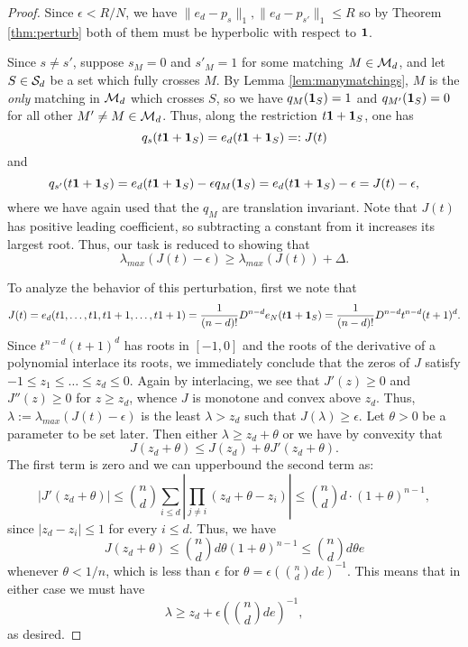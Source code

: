 \begin{proof} Since $\epsilon<R/N$, we have $\|e_d-p_s\|_1,\|e_d-p_{s'}\|_1 \le R$ so by Theorem \ref{thm:perturb} both of them must be hyperbolic with respect to $\one$.

Since $s\neq s'$, suppose $s_M=0$ and $s'_M=1$ for some matching $M\in\M_d$, and let $S\in \S_d$ be a set which fully crosses $M$.  By Lemma \ref{lem:manymatchings}, $M$ is the {\em only} matching in $\M_d$ which crosses $S$, so we have $q_M(\one_S)=1$ and $q_{M'}(\one_S)=0$ for all other $M'\neq M\in\M_d$. Thus, along the restriction $t\one +\one_S$, one has
\begin{equation}\label{eqn:jacobi} q_s(t\one+\one_S) = e_d(t\one + \one_S)=:J(t)\end{equation}
and
$$q_{s'}(t\one+\one_S) = e_d(t\one + \one_S)-\epsilon q_M(\one_S) = e_d(t\one+\one_S)-\epsilon=J(t)-\epsilon,$$
where we have again used that the $q_M$ are translation invariant. Note that $J(t)$ has positive leading coefficient, so subtracting a constant from it increases its largest root. Thus, our task is reduced to showing that
$$\lambda_{max}(J(t)-\epsilon)\ge \lambda_{max}(J(t))+\Delta.$$

To analyze the behavior of this perturbation, first we note that 
$$J(t)= e_d(t1, \ldots, t1, t1 + 1, \ldots, t1 + 1) = \frac{1}{(n-d)!} D^{n-d} e_N(t \one + \one_S) = \frac{1}{(n-d)!} D^{n-d}t^{n-d} (t+1)^d.$$
Since $t^{n-d}(t+1)^d$ has roots in $[-1,0]$ and the roots of the derivative of a polynomial interlace its roots, 
we immediately conclude that the zeros of $J$ satisfy $-1\le z_1\le \ldots \le z_d\le 0$. 
Again by interlacing, we see that $J'(z)\ge 0$ and $J''(z)\ge 0$ for $z\ge z_d$, whence $J$ is monotone and convex above $z_d$. Thus, $\lambda:=\lambda_{max}(J(t)-\epsilon)$ is the least $\lambda>z_d$ such that $J(\lambda)\ge \epsilon$. Let $\theta>0$ be a parameter to be set later. Then either $\lambda\ge z_d+\theta$ or we have by convexity that
$$J(z_d+\theta)\le J(z_d)+\theta J'(z_d+\theta).$$
The first term is zero and we can upperbound the second term as:
$$|J'(z_d+\theta)| \le \binom{n}{d} \sum_{i\le d}|\prod_{j\neq i}(z_d+\theta-z_i)|\le \binom{n}{d} d\cdot (1+\theta)^{n-1},$$
since $|z_d-z_i|\le 1$ for every $i\le d$. Thus, we have
$$ J(z_d+\theta)\le \binom{n}{d}d\theta(1+\theta)^{n-1}\le \binom{n}{d} d\theta e$$
whenever $\theta<1/n$, which is less than $\epsilon$ for $\theta=\epsilon (\binom{n}{d} d e)^{-1}$. This means that in either case we must have
$$\lambda\ge z_d+	\epsilon \left(\binom{n}{d} d e\right)^{-1},$$
as desired.
\end{proof}
